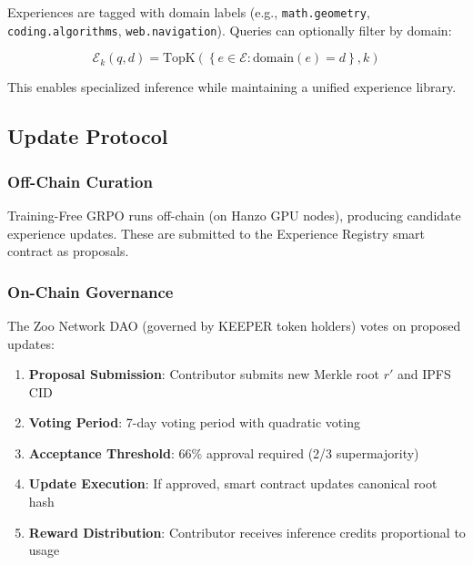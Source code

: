 Experiences are tagged with domain labels (e.g., \texttt{math.geometry}, \texttt{coding.algorithms}, \texttt{web.navigation}). Queries can optionally filter by domain:

\begin{equation}
\mathcal{E}_k(q, d) = \text{TopK}\left( \left\{ e \in \mathcal{E} : \text{domain}(e) = d \right\}, k \right)
\end{equation}

This enables specialized inference while maintaining a unified experience library.

\subsection{Update Protocol}

\subsubsection{Off-Chain Curation}

Training-Free GRPO runs off-chain (on Hanzo GPU nodes), producing candidate experience updates. These are submitted to the Experience Registry smart contract as proposals.

\subsubsection{On-Chain Governance}

The Zoo Network DAO (governed by KEEPER token holders) votes on proposed updates:

\begin{enumerate}
    \item \textbf{Proposal Submission}: Contributor submits new Merkle root $r'$ and IPFS CID
    \item \textbf{Voting Period}: 7-day voting period with quadratic voting
    \item \textbf{Acceptance Threshold}: 66\% approval required (2/3 supermajority)
    \item \textbf{Update Execution}: If approved, smart contract updates canonical root hash
    \item \textbf{Reward Distribution}: Contributor receives inference credits proportional to usage
\end{enumerate}

